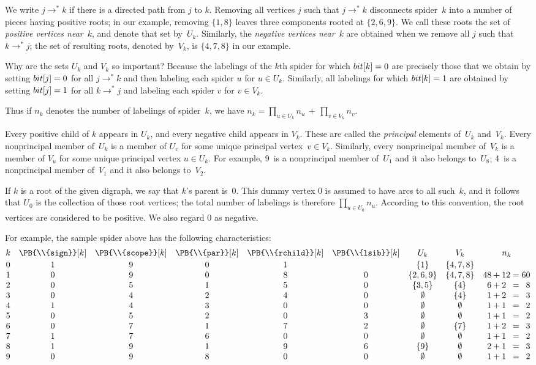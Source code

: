 We write $j\to^* k$ if there is a directed path from $j$ to $k$.
Removing all vertices $j$ such that $j\to^* k$ disconnects spider~$k$
into a number of pieces having positive roots; in our example, removing
$\{1,8\}$ leaves three components rooted at $\{2,6,9\}$. We call these roots
the set of {\it positive vertices near\/}~$k$, and denote that set by~$U_k$.
Similarly, the {\it negative vertices near\/}~$k$ are obtained when we remove
all $j$ such that $k\to^* j$; the set of resulting roots, denoted by~$V_k$,
is $\{4,7,8\}$ in our example.

Why are the sets $U_k$ and $V_k$ so important? Because
the labelings of the $k$th spider for which $\\{bit}[k]=0$ are
precisely those that we obtain by setting $\\{bit}[j]=0$ for all $j\to^* k$
and then labeling each spider $u$ for $u\in U_k$.
Similarly, all labelings for which $\\{bit}[k]=1$ are obtained by
setting $\\{bit}[j]=1$ for all $k\to^* j$ and labeling each spider
$v$ for $v\in V_k$.

Thus if $n_k$ denotes the number of labelings of spider~$k$,
we have $n_k=\prod_{u\in U_k}n_u\,+\,\prod_{v\in V_k}n_v$.

\smallskip

Every positive child of $k$ appears in $U_k$, and every negative
child appears in $V_k$. These are called the {\it principal\/}
elements of~$U_k$ and~$V_k$. Every nonprincipal member of~$U_k$ is a member
of $U_v$ for some unique principal vertex~$v\in V_k$. Similarly, every
nonprincipal member of~$V_k$ is a member of $V_u$ for some unique
principal vertex $u\in U_k$. For example, 9~is a nonprincipal member of~$U_1$
and it also belongs to~$U_8$; 4~is a nonprincipal member of~$V_1$ and it
also belongs to~$V_2$.

If $k$ is a root of the given digraph, we say that $k$'s parent is~0.
This dummy vertex 0 is assumed to have arcs to all such~$k$, and it follows
that $U_0$ is the collection of those root vertices; the total number
of labelings is therefore $\prod_{u\in U_0}n_u$.
According to this convention, the root vertices
are considered to be positive. We also regard 0 as negative.

For example, the sample spider above has the following characteristics:
$$\vbox{\halign{$\hfil#\hfil$\quad&
$\hfil#\hfil$\quad&
$\hfil#\hfil$\quad&
$\hfil#\hfil$\quad&
$\hfil#\hfil$\quad&
$\hfil#\hfil$\quad&
$\hfil#\hfil$\quad&
$\hfil#\hfil$\quad&
$\hfil#+{}$&$#\hfil={}$&\hfil#\cr
k&\PB{\\{sign}}[k]&\PB{\\{scope}}[k]&\PB{\\{par}}[k]&\PB{\\{rchild}}[k]&\PB{%
\\{lsib}}[k]&U_k&V_k&
\multispan3{\hfil$n_k$\hfil}\cr
\noalign{\vskip2pt}
0&1&9&0&1& &\{1\}&\{4,7,8\}\cr
1&0&9&0&8&0&\{2,6,9\}&\{4,7,8\}&48&12&60\cr
2&0&5&1&5&0&\{3,5\}&\{4\}&6&2&8\cr
3&0&4&2&4&0&\emptyset&\{4\}&1&2&3\cr
4&1&4&3&0&0&\emptyset&\emptyset&1&1&2\cr
5&0&5&2&0&3&\emptyset&\emptyset&1&1&2\cr
6&0&7&1&7&2&\emptyset&\{7\}&1&2&3\cr
7&1&7&6&0&0&\emptyset&\emptyset&1&1&2\cr
8&1&9&1&9&6&\{9\}&\emptyset&2&1&3\cr
9&0&9&8&0&0&\emptyset&\emptyset&1&1&2\cr}}$$


